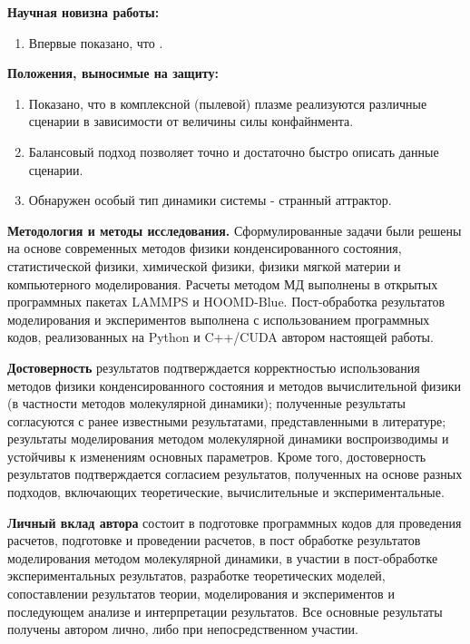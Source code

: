 \textbf{Научная новизна работы:}
\begin{enumerate}
\item Впервые показано, что .

\end{enumerate}

\textbf{Положения, выносимые на защиту:}
\begin{enumerate}
\item Показано, что в комплексной (пылевой) плазме реализуются различные сценарии в зависимости от величины силы конфайнмента.
\item Балансовый подход позволяет точно и достаточно быстро описать данные сценарии.
\item Обнаружен особый тип динамики системы - странный аттрактор.
\end{enumerate}

\textbf{Методология и методы исследования.} Сформулированные задачи были решены на основе современных методов физики конденсированного состояния, статистической физики, химической физики, физики мягкой материи и компьютерного
моделирования.
Расчеты методом МД выполнены в открытых программных пакетах LAMMPS и HOOMD-Blue. Пост-обработка результатов моделирования и экспериментов выполнена с использованием программных кодов, реализованных на Python и C++/CUDA автором настоящей работы.


\textbf{Достоверность} результатов подтверждается корректностью использования методов физики конденсированного состояния и методов вычислительной физики (в частности методов молекулярной динамики); полученные результаты согласуются с ранее известными результатами, представленными в литературе; результаты моделирования методом молекулярной динамики воспроизводимы и устойчивы к изменениям основных параметров.
Кроме того, достоверность результатов подтверждается согласием результатов, полученных на основе разных подходов, включающих теоретические, вычислительные и экспериментальные.

\textbf{Личный вклад автора} состоит в подготовке программных кодов для проведения расчетов, подготовке и проведении расчетов, в пост обработке результатов моделирования методом молекулярной динамики, в участии в пост-обработке экспериментальных результатов, разработке теоретических моделей, сопоставлении результатов теории, моделирования и экспериментов и последующем анализе и интерпретации результатов. Все основные результаты
получены автором лично, либо при непосредственном участии.


